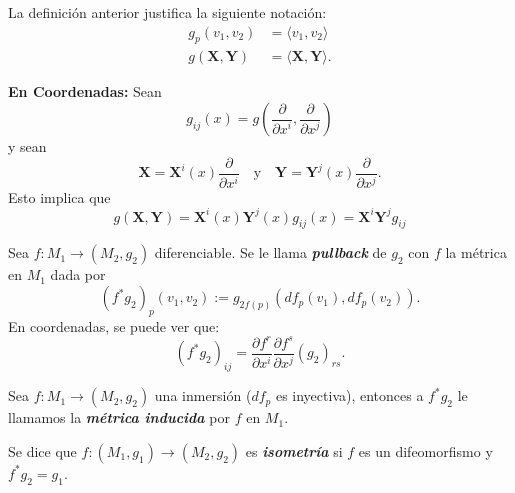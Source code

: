 \begin{notation}
La definici\'on anterior justifica la siguiente notaci\'on:
\begin{align*}
    g_p(v_1,v_2)&=\langle v_1,v_2\rangle\\
    g(\mathbf{X},\mathbf{Y})&=\langle \mathbf{X},\mathbf{Y}\rangle.
\end{align*}
\end{notation}

\noindent\textbf{En Coordenadas:} Sean 
\begin{equation*}
    g_{ij}(x)=g\left(\frac{\partial}{\partial x^i},\frac{\partial}{\partial x^j}\right)
\end{equation*}
y sean
\begin{equation*}
    \mathbf{X}=\mathbf{X}^i(x)\frac{\partial}{\partial x^i}\quad\text{y}\quad\mathbf{Y}=\mathbf{Y}^j(x)\frac{\partial}{\partial x^j}.
\end{equation*}
Esto implica que 
\begin{equation*}
    g(\mathbf{X},\mathbf{Y})=\mathbf{X}^i(x)\mathbf{Y}^j(x)g_{ij}(x)=\mathbf{X}^i\mathbf{Y}^jg_{ij}
\end{equation*}

\begin{definition}
Sea $f\colon M_1\to(M_2,g_2)$ diferenciable. Se le llama \textit{\textbf{pullback}} de $g_2$ con $f$ la m\'etrica en $M_1$ dada por
\begin{equation*}
    (f^*g_2)_p(v_1,v_2):=g_{2{f(p)}}(df_p(v_1),df_p(v_2)).
\end{equation*}
En coordenadas, se puede ver que:
\begin{equation*}
    (f^*g_2)_{ij}=\frac{\partial f^r}{\partial x^i}\frac{\partial f^s}{\partial x^j}(g_2)_{rs}.
\end{equation*}
\end{definition}

\begin{definition}
Sea $f\colon M_1\to(M_2,g_2)$ una inmersi\'on ($df_p$ es inyectiva), entonces a $f^*g_2$ le llamamos la \textit{\textbf{m\'etrica inducida}} por $f$ en $M_1$.   
\end{definition}


\begin{definition}
Se dice que $f\colon (M_1,g_1)\to(M_2,g_2)$ es \textit{\textbf{isometr\'ia}} si $f$ es un difeomorfismo y $f^*g_2=g_1$.    
\end{definition}



